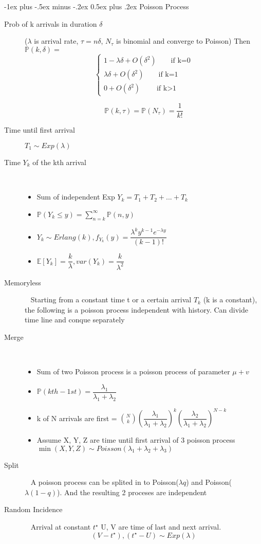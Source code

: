 \documentclass[a4paper, 10pt,landscape]{article}
\makeatletter
\renewcommand{\section}{\@startsection{section}{1}{0mm}%
                                {-1ex plus -.5ex minus -.2ex}%
                                {0.5ex plus .2ex}%
                                {\normalfont\large\bfseries}}
\makeatother
\begin{document}
\begin{multicols*}{4}
\section{Poisson Process}
\begin{description}
	\item[Prob of k arrivals in duration $\delta$] ($\lambda$ is arrival rate, $\tau = n \delta$, $N_{\tau}$ is binomial and converge to Poisson) Then $\mathbb{P}(k, \delta)=$
		$$\begin{cases}
				1 - \lambda \delta + O(\delta^2) \qquad\text{if k=0}\\[10pt]
				\lambda \delta + O(\delta^2)\qquad \text{if k=1}\\[10pt]
				0 + O(\delta^2) \qquad \text{if k$>$1}
		\end{cases}$$

		$$\mathbb{P}(k,\tau) = \mathbb{P}(N_{\tau}) = \dfrac{1}{k!}$$

	\item[Time until first arrival] $T_1 \sim Exp(\lambda)$

	\item[Time $Y_k$ of the kth arrival]~
		\begin{itemize}
			\item Sum of independent Exp $Y_k = T_1 + T_2 + ... + T_k$
			\item $\mathbb{P}(Y_k \leq y) = \sum_{n=k}^{\infty}\mathbb{P}(n, y)$
			\item $Y_k \sim Erlang(k),  f_{Y_k}(y) = \dfrac{\lambda^k y^{k-1} e^{-\lambda y} }{(k-1)!}$
			\item $\mathbb{E}[Y_k] = \dfrac{k}{\lambda}, var(Y_k)=\dfrac{k}{\lambda^2}$
		\end{itemize}
	\item[Memoryless]~
		Starting from a constant time t or a certain arrival $T_k$ (k is a constant), the following is a poisson process independent with history. Can divide time line and conque separately
	\item[Merge]~
		\begin{itemize}
			\item Sum of two Poisson process is a poisson process of parameter $\mu + v$
			\item $\mathbb{P}(kth - 1st) = \dfrac{\lambda_1}{\lambda_1 + \lambda_2}$
			\item k of N arrivals are first = $\binom{N}{k}(\dfrac{\lambda_1}{\lambda_1 + \lambda_2})^k (\dfrac{\lambda_2}{\lambda_1 + \lambda_2})^{N-k}$
			\item Assume X, Y, Z are time until first arrival of 3 poisson process $\min(X, Y, Z) \sim Poisson(\lambda_1 + \lambda_2 + \lambda_3)$
		\end{itemize}
	\item[Split]~
		A poisson process can be splited in to Poisson($\lambda q$) and Poisson($\lambda (1-q)$). And the resulting 2 proceses are independent
	\item[Random Incidence]~ 
		Arrival at constant $t^{\star}$ U, V are time of last and next arrival.
		$$(V - t^{\star}) , (t^{\star} - U) \sim Exp(\lambda)$$
\end{description}

\end{multicols*}
\end{document}
